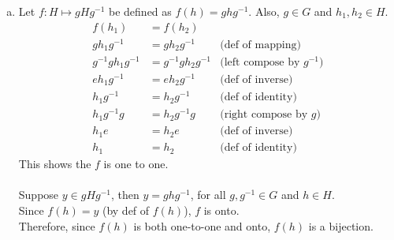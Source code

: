 \begin{enumerate}[(a)]
\item
Let $f: H \mapsto gHg^{-1}$ be defined as $f(h) = ghg^{-1}$. Also, $g \in G$ and $h_1, h_2 \in H$.
\begin{align*}
f(h_1) &= f(h_2)
\\
gh_1g^{-1} &= gh_2g^{-1} &\text{(def of mapping)}
\\
g^{-1}gh_1g^{-1} &= g^{-1}gh_2g^{-1} &\text{(left compose by\ } g^{-1}\text{)}
\\
eh_1g^{-1} &= eh_2g^{-1} &\text{(def of inverse)}
\\
h_1g^{-1} &= h_2g^{-1} &\text{(def of identity)}
\\
h_1g^{-1}g &= h_2g^{-1}g &\text{(right compose by\ } g\text{)}
\\
h_1e &= h_2e &\text{(def of inverse)}
\\
h_1 &= h_2 &\text{(def of identity)}
\end{align*}
This shows the $f$ is one to one.
\\
\\
Suppose $y \in gHg^{-1}$, then $y = ghg^{-1}$, for all $g, g^{-1} \in G$ and $h \in H$.
\\
Since $f(h) = y$ (by def of $f(h)$), $f$ is onto.
\\
Therefore, since $f(h)$ is both one-to-one and onto, $f(h)$ is a bijection.
\end{enumerate}


